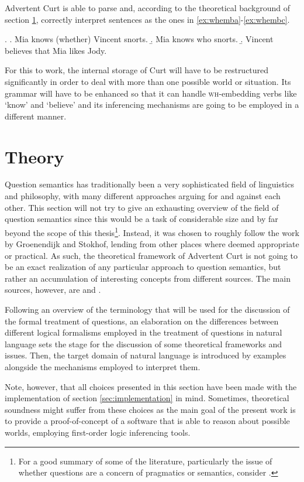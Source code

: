 \documentclass[a4paper]{article}
\newcommand{\pn}{\textsf} %
\newcommand{\wh}{\textsc{wh}}
\newcommand{\curt}{\pn{Curt}}
\newcommand{\acurt}{\pn{Advertent Curt}}
\theoremstyle{remark}
\theoremstyle{remark}
\theoremstyle{definition}
\theoremstyle{definition}
\begin{document}
\acurt{} is able to parse and, according to the theoretical background of section
\ref{sec:theory}, correctly interpret sentences as the ones in
\ref{ex:whemba}-\ref{ex:whembc}.

\ex.
\a.  Mia knows (whether) Vincent snorts.\label{ex:whemba}
\b.  Mia knows who snorts.
\b.  Vincent believes that Mia likes Jody.\label{ex:whembc}

For this to work, the internal storage of \curt{} will have to be restructured
significantly in order to deal with more than one possible world or situation.
Its grammar will have to be enhanced so that it can handle \wh-embedding verbs
like `know' and `believe' and its inferencing mechanisms are going to be
employed in a different manner. %

\section{Theory}\label{sec:theory}

Question semantics has traditionally been a very sophisticated field of
linguistics and philosophy, with many different approaches arguing for and
against each other. This section will not try to give an exhausting overview of
the field of question semantics since this would be a task of considerable size
and by far beyond the scope of this thesis\footnote{For a good summary of some
of the literature, particularly the issue of whether questions are a concern of
pragmatics or semantics, consider \cite[section 2 and 3]{gs:q}.}. Instead, it
was chosen to roughly follow the work by Groenendijk and Stokhof, lending from
other places where deemed appropriate or practical. As such, the theoretical
framework of \acurt{} is not going to be an exact realization of any particular
approach to question semantics, but rather an accumulation of interesting
concepts from different sources. The main sources, however, are \cite{gs:q} and
\cite{gs:sqpa}.

Following an overview of the terminology that will be used for the discussion of
the formal treatment of questions, an  elaboration on the differences between
different logical formalisms employed in the treatment of questions in natural
language sets the stage for the discussion of some theoretical frameworks and
issues. Then, the target domain of natural language is introduced by examples
alongside the mechanisms employed to interpret them. 

Note, however, that all choices presented in this section have been made
with the implementation of section \ref{sec:implementation} in mind.
Sometimes, theoretical soundness might suffer from these choices as the main
goal of the present work is to provide a proof-of-concept of a software that is
able to reason about possible worlds, employing first-order logic inferencing
tools. %
\end{document}
